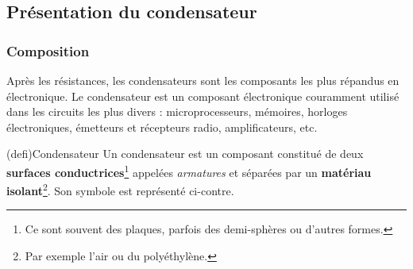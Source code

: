 \documentclass[../../main/main.tex]{subfiles}
\begin{document}
\subsection{Présentation du condensateur}
\subsubsection{Composition}

Après les résistances, les condensateurs sont les composants les plus répandus
en électronique. Le condensateur est un composant électronique couramment
utilisé dans les circuits les plus divers : microprocesseurs, mémoires, horloges électroniques, émetteurs et récepteurs radio, amplificateurs, etc.

\begin{tcb}[label=def:condens, sidebyside, righthand ratio=.3](defi){Condensateur}
	Un condensateur est un composant constitué de deux \textbf{surfaces
		conductrices}\footnote{Ce sont souvent des plaques, parfois des demi-sphères
		ou d'autres formes.} appelées \textit{armatures} et séparées par un
	\textbf{matériau isolant}\footnote{Par exemple l'air ou du polyéthylène.}.
	Son symbole est représenté ci-contre.
	\tcblower
	\begin{center}
	\end{center}
\end{tcb}
\end{document}
